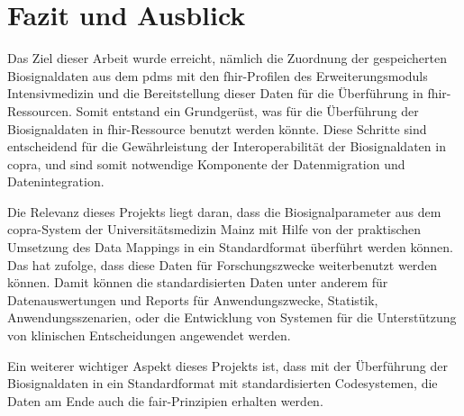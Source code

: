 \chapter{Fazit und Ausblick} \label{ch:conclussion}

Das Ziel dieser Arbeit wurde erreicht, nämlich die Zuordnung der gespeicherten Biosignaldaten aus dem \ac{pdms} mit den \ac{fhir}-Profilen des Erweiterungsmoduls \glqq Intensivmedizin\grqq{} und die Bereitstellung dieser Daten für die Überführung in \ac{fhir}-Ressourcen. Somit entstand ein Grundgerüst, was für die Überführung der Biosignaldaten in \ac{fhir}-Ressource benutzt werden könnte. Diese Schritte sind entscheidend für die Gewährleistung der Interoperabilität der Biosignaldaten in \ac{copra}, und sind somit notwendige Komponente der Datenmigration und Datenintegration.

Die Relevanz dieses Projekts liegt daran, dass die Biosignalparameter aus dem \ac{copra}-System der Universitätsmedizin Mainz mit Hilfe von der praktischen Umsetzung des Data Mappings in ein Standardformat überführt werden können. Das hat zufolge, dass diese Daten für Forschungszwecke weiterbenutzt werden können. Damit können die standardisierten Daten unter anderem für Datenauswertungen und Reports für Anwendungszwecke, Statistik, Anwendungsszenarien, oder die Entwicklung von Systemen für die Unterstützung von klinischen Entscheidungen angewendet werden.

Ein weiterer wichtiger Aspekt dieses Projekts ist, dass mit der Überführung der Biosignaldaten in ein Standardformat mit standardisierten Codesystemen, die Daten am Ende auch die \ac{fair}-Prinzipien erhalten werden.
